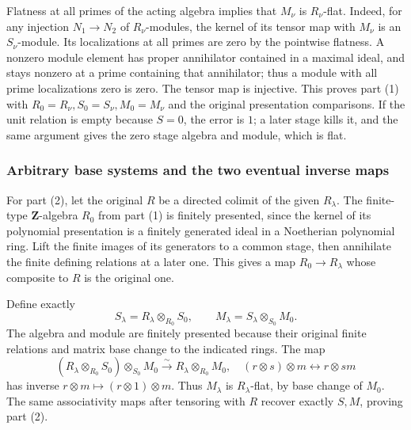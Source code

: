 Flatness at all primes of the acting algebra implies that \(M_\nu\) is \(R_\nu\)-flat. Indeed, for any injection \(N_1\to N_2\) of \(R_\nu\)-modules, the kernel of its tensor map with \(M_\nu\) is an \(S_\nu\)-module. Its localizations at all primes are zero by the pointwise flatness. A nonzero module element has proper annihilator contained in a maximal ideal, and stays nonzero at a prime containing that annihilator; thus a module with all prime localizations zero is zero. The tensor map is injective. This proves part (1) with \(R_0=R_\nu,S_0=S_\nu,M_0=M_\nu\) and the original presentation comparisons. If the unit relation is empty because \(S=0\), the error is \(1\); a later stage kills it, and the same argument gives the zero stage algebra and module, which is flat.

\subsubsection{Arbitrary base systems and the two eventual inverse maps}\label{arbitrary-base-systems-and-the-two-eventual-inverse-maps}

For part (2), let the original \(R\) be a directed colimit of the given \(R_\lambda\). The finite-type \(\mathbf Z\)-algebra \(R_0\) from part (1) is finitely presented, since the kernel of its polynomial presentation is a finitely generated ideal in a Noetherian polynomial ring. Lift the finite images of its generators to a common stage, then annihilate the finite defining relations at a later one. This gives a map \(R_0\to R_\lambda\) whose composite to \(R\) is the original one.

Define exactly \[
 S_\lambda=R_\lambda\otimes_{R_0}S_0,
 \qquad M_\lambda=S_\lambda\otimes_{S_0}M_0.
\] The algebra and module are finitely presented because their original finite relations and matrix base change to the indicated rings. The map \[
 (R_\lambda\otimes_{R_0}S_0)\otimes_{S_0}M_0
    \xrightarrow{\sim}R_\lambda\otimes_{R_0}M_0,
 \quad(r\otimes s)\otimes m\longleftrightarrow r\otimes sm
\] has inverse \(r\otimes m\mapsto(r\otimes1)\otimes m\). Thus \(M_\lambda\) is \(R_\lambda\)-flat, by base change of \(M_0\). The same associativity maps after tensoring with \(R\) recover exactly \(S,M\), proving part (2).

